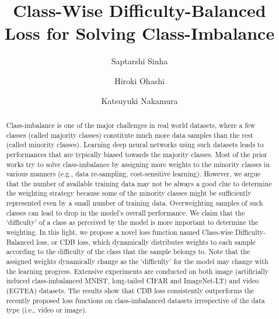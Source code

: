 \documentclass[runningheads]{llncs}
\begin{document}
\pagestyle{headings}
\mainmatter

\def\ACCV20SubNumber{281}  

\title{Class-Wise Difficulty-Balanced Loss for Solving
	Class-Imbalance} 
\author{Saptarshi Sinha \and
Hiroki Ohashi \and
Katsuyuki Nakamura}

\maketitle

\begin{abstract}
Class-imbalance is one of the major challenges in real world datasets, where a 
few classes (called majority classes) constitute much more data
samples than the rest (called minority classes). Learning deep neural networks
using such datasets leads to performances that are typically biased towards the
majority classes. Most of the prior works try to solve class-imbalance by 
assigning more weights to the minority classes in various manners (e.g., data
re-sampling, cost-sensitive learning). However, we argue that the number of
available training data may not be always a good clue to determine the weighting 
strategy because some of the minority classes might be sufficiently represented 
even by a small number of training data. Overweighting samples of such
classes can lead to drop in the model’s overall performance. We claim that the
‘difficulty’ of a class as perceived by the model is more important to determine
the weighting. In this light, we propose a novel loss function named Class-wise
Difficulty-Balanced loss, or CDB loss, which dynamically distributes weights
to each sample according to the difficulty of the class that the sample belongs
to. Note that the assigned weights dynamically change as the ‘difficulty’ for
the model may change with the learning progress. Extensive experiments are
conducted on both image (artificially induced class-imbalanced MNIST,
long-tailed CIFAR and ImageNet-LT) and video (EGTEA) datasets. The results show 
that CDB
loss consistently outperforms the recently proposed loss functions on 
class-imbalanced datasets irrespective of the data type (i.e., video or image).
\end{abstract}
\end{document}
